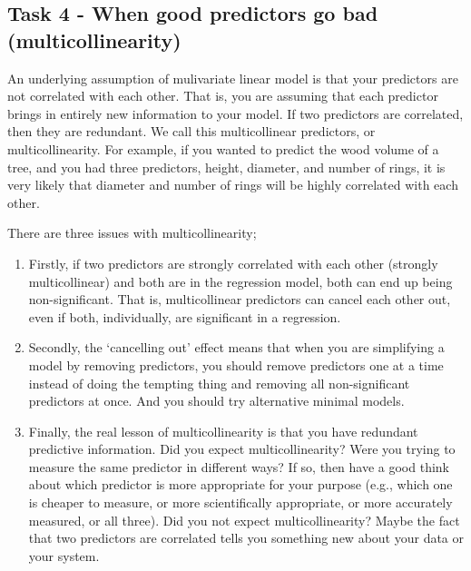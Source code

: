 \documentclass[
]{book}
\providecommand{\tightlist}{%
  \setlength{\itemsep}{0pt}\setlength{\parskip}{0pt}}
\begin{document}
\hypertarget{task-4---when-good-predictors-go-bad-multicollinearity}{%
\subsection{Task 4 - When good predictors go bad (multicollinearity)}\label{task-4---when-good-predictors-go-bad-multicollinearity}}

An underlying assumption of mulivariate linear model is that your predictors are not correlated with each other. That is, you are assuming that each predictor brings in entirely new information to your model. If two predictors are correlated, then they are redundant. We call this multicollinear predictors, or multicollinearity. For example, if you wanted to predict the wood volume of a tree, and you had three predictors, height, diameter, and number of rings, it is very likely that diameter and number of rings will be highly correlated with each other.

There are three issues with multicollinearity;

\begin{enumerate}
\def\labelenumi{\arabic{enumi})}
\tightlist
\item
  Firstly, if two predictors are strongly correlated with each other (strongly multicollinear) and both are in the regression model, both can end up being non-significant. That is, multicollinear predictors can cancel each other out, even if both, individually, are significant in a regression.\\
\item
  Secondly, the `cancelling out' effect means that when you are simplifying a model by removing predictors, you should remove predictors one at a time instead of doing the tempting thing and removing all non-significant predictors at once. And you should try alternative minimal models.\\
\item
  Finally, the real lesson of multicollinearity is that you have redundant predictive information. Did you expect multicollinearity? Were you trying to measure the same predictor in different ways? If so, then have a good think about which predictor is more appropriate for your purpose (e.g., which one is cheaper to measure, or more scientifically appropriate, or more accurately measured, or all three). Did you not expect multicollinearity? Maybe the fact that two predictors are correlated tells you something new about your data or your system.
\end{enumerate}
\end{document}

